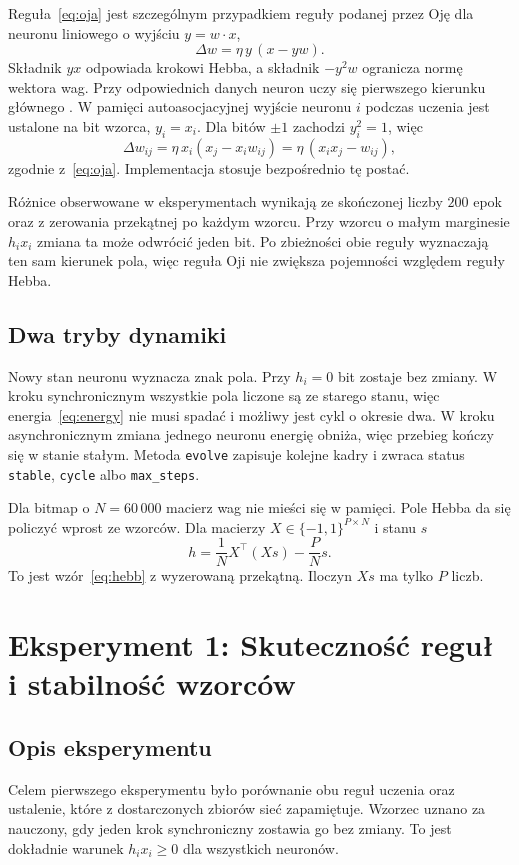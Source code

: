 \documentclass[11pt,a4paper]{article}
\begin{document}
Reguła~\eqref{eq:oja} jest szczególnym przypadkiem reguły podanej przez Oję dla neuronu liniowego o wyjściu \(y = w \cdot x\),
\[
    \Delta w = \eta\, y\,(x - y w).
\]
Składnik \(yx\) odpowiada krokowi Hebba, a składnik \(-y^2 w\) ogranicza normę wektora wag. Przy odpowiednich danych neuron uczy się pierwszego kierunku głównego \cite{oja1982}. W pamięci autoasocjacyjnej wyjście neuronu \(i\) podczas uczenia jest ustalone na bit wzorca, \(y_i = x_i\). Dla bitów \(\pm 1\) zachodzi \(y_i^2 = 1\), więc
\[
    \Delta w_{ij}
    = \eta\, x_i (x_j - x_i w_{ij})
    = \eta\,(x_i x_j - w_{ij}),
\]
zgodnie z~\eqref{eq:oja}. Implementacja stosuje bezpośrednio tę postać.

Różnice obserwowane w eksperymentach wynikają ze skończonej liczby \(200\) epok oraz z zerowania przekątnej po każdym wzorcu. Przy wzorcu o małym marginesie \(h_i x_i\) zmiana ta może odwrócić jeden bit. Po zbieżności obie reguły wyznaczają ten sam kierunek pola, więc reguła Oji nie zwiększa pojemności względem reguły Hebba.

\subsection{Dwa tryby dynamiki}
Nowy stan neuronu wyznacza znak pola. Przy \(h_i = 0\) bit zostaje bez zmiany. W kroku synchronicznym wszystkie pola liczone są ze starego stanu, więc energia~\eqref{eq:energy} nie musi spadać i możliwy jest cykl o okresie dwa. W kroku asynchronicznym zmiana jednego neuronu energię obniża, więc przebieg kończy się w stanie stałym. Metoda \texttt{evolve} zapisuje kolejne kadry i zwraca status \texttt{stable}, \texttt{cycle} albo \texttt{max\_steps}.

Dla bitmap o \(N = 60\,000\) macierz wag nie mieści się w pamięci. Pole Hebba da się policzyć wprost ze wzorców. Dla macierzy \(X \in \{-1,1\}^{P \times N}\) i stanu \(s\)
\begin{equation}
\label{eq:implicit}
    h = \frac{1}{N} X^{\top}(Xs) - \frac{P}{N}s.
\end{equation}
To jest wzór~\eqref{eq:hebb} z wyzerowaną przekątną. Iloczyn \(Xs\) ma tylko \(P\) liczb.

\section{Eksperyment 1: Skuteczność reguł i stabilność wzorców}
\label{sec:exp_stability}

\subsection{Opis eksperymentu}
Celem pierwszego eksperymentu było porównanie obu reguł uczenia oraz ustalenie, które z dostarczonych zbiorów sieć zapamiętuje. Wzorzec uznano za nauczony, gdy jeden krok synchroniczny zostawia go bez zmiany. To jest dokładnie warunek \(h_i x_i \ge 0\) dla wszystkich neuronów.
\end{document}

